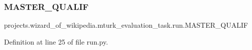 \subsubsection{\texorpdfstring{M\+A\+S\+T\+E\+R\+\_\+\+Q\+U\+A\+L\+IF}{MASTER\_QUALIF}}
{\footnotesize\ttfamily projects.\+wizard\+\_\+of\+\_\+wikipedia.\+mturk\+\_\+evaluation\+\_\+task.\+run.\+M\+A\+S\+T\+E\+R\+\_\+\+Q\+U\+A\+L\+IF}



Definition at line 25 of file run.\+py.

